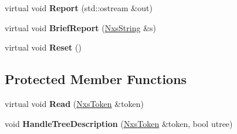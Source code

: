 \begin{DoxyCompactItemize}
\item 
\hypertarget{classNxsTreesBlock_a0303349f1351d4a00f20be5130783fa9}{
virtual void {\bfseries Report} (std::ostream \&out)}
\label{classNxsTreesBlock_a0303349f1351d4a00f20be5130783fa9}

\item 
\hypertarget{classNxsTreesBlock_ab6f6fde301d28f9082acca328b1cddcc}{
virtual void {\bfseries BriefReport} (\hyperlink{classNxsString}{NxsString} \&s)}
\label{classNxsTreesBlock_ab6f6fde301d28f9082acca328b1cddcc}

\item 
\hypertarget{classNxsTreesBlock_aebea09e1b7b01331ee2f89beee2ece46}{
virtual void {\bfseries Reset} ()}
\label{classNxsTreesBlock_aebea09e1b7b01331ee2f89beee2ece46}

\end{DoxyCompactItemize}
\subsection*{Protected Member Functions}
\begin{DoxyCompactItemize}
\item 
\hypertarget{classNxsTreesBlock_a60a667c2b280c08ddd2608e0b2aff9d3}{
virtual void {\bfseries Read} (\hyperlink{classNxsToken}{NxsToken} \&token)}
\label{classNxsTreesBlock_a60a667c2b280c08ddd2608e0b2aff9d3}

\item 
\hypertarget{classNxsTreesBlock_ad54cdad1ec707602b1468af2962f5b15}{
void {\bfseries HandleTreeDescription} (\hyperlink{classNxsToken}{NxsToken} \&token, bool utree)}
\label{classNxsTreesBlock_ad54cdad1ec707602b1468af2962f5b15}

\end{DoxyCompactItemize}

